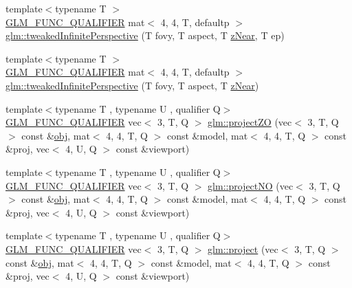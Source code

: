 \begin{DoxyCompactItemize}
\item 
{\footnotesize template$<$typename T $>$ }\\\hyperlink{setup_8hpp_a33fdea6f91c5f834105f7415e2a64407}{G\+L\+M\+\_\+\+F\+U\+N\+C\+\_\+\+Q\+U\+A\+L\+I\+F\+I\+ER} mat$<$ 4, 4, T, defaultp $>$ \hyperlink{group__gtc__matrix__transform_gaf5b3c85ff6737030a1d2214474ffa7a8}{glm\+::tweaked\+Infinite\+Perspective} (T fovy, T aspect, T \hyperlink{_s_d_l__opengl__glext_8h_a12d99226e590bbaaf0be69169eeb4834}{z\+Near}, T ep)
\item 
{\footnotesize template$<$typename T $>$ }\\\hyperlink{setup_8hpp_a33fdea6f91c5f834105f7415e2a64407}{G\+L\+M\+\_\+\+F\+U\+N\+C\+\_\+\+Q\+U\+A\+L\+I\+F\+I\+ER} mat$<$ 4, 4, T, defaultp $>$ \hyperlink{group__gtc__matrix__transform_gaaeacc04a2a6f4b18c5899d37e7bb3ef9}{glm\+::tweaked\+Infinite\+Perspective} (T fovy, T aspect, T \hyperlink{_s_d_l__opengl__glext_8h_a12d99226e590bbaaf0be69169eeb4834}{z\+Near})
\item 
{\footnotesize template$<$typename T , typename U , qualifier Q$>$ }\\\hyperlink{setup_8hpp_a33fdea6f91c5f834105f7415e2a64407}{G\+L\+M\+\_\+\+F\+U\+N\+C\+\_\+\+Q\+U\+A\+L\+I\+F\+I\+ER} vec$<$ 3, T, Q $>$ \hyperlink{group__gtc__matrix__transform_ga77d157525063dec83a557186873ee080}{glm\+::project\+ZO} (vec$<$ 3, T, Q $>$ const \&\hyperlink{_s_d_l__opengl__glext_8h_a0c0d4701a6c89f4f7f0640715d27ab26}{obj}, mat$<$ 4, 4, T, Q $>$ const \&model, mat$<$ 4, 4, T, Q $>$ const \&proj, vec$<$ 4, U, Q $>$ const \&viewport)
\item 
{\footnotesize template$<$typename T , typename U , qualifier Q$>$ }\\\hyperlink{setup_8hpp_a33fdea6f91c5f834105f7415e2a64407}{G\+L\+M\+\_\+\+F\+U\+N\+C\+\_\+\+Q\+U\+A\+L\+I\+F\+I\+ER} vec$<$ 3, T, Q $>$ \hyperlink{group__gtc__matrix__transform_ga05249751f48d14cb282e4979802b8111}{glm\+::project\+NO} (vec$<$ 3, T, Q $>$ const \&\hyperlink{_s_d_l__opengl__glext_8h_a0c0d4701a6c89f4f7f0640715d27ab26}{obj}, mat$<$ 4, 4, T, Q $>$ const \&model, mat$<$ 4, 4, T, Q $>$ const \&proj, vec$<$ 4, U, Q $>$ const \&viewport)
\item 
{\footnotesize template$<$typename T , typename U , qualifier Q$>$ }\\\hyperlink{setup_8hpp_a33fdea6f91c5f834105f7415e2a64407}{G\+L\+M\+\_\+\+F\+U\+N\+C\+\_\+\+Q\+U\+A\+L\+I\+F\+I\+ER} vec$<$ 3, T, Q $>$ \hyperlink{group__gtc__matrix__transform_gaf36e96033f456659e6705472a06b6e11}{glm\+::project} (vec$<$ 3, T, Q $>$ const \&\hyperlink{_s_d_l__opengl__glext_8h_a0c0d4701a6c89f4f7f0640715d27ab26}{obj}, mat$<$ 4, 4, T, Q $>$ const \&model, mat$<$ 4, 4, T, Q $>$ const \&proj, vec$<$ 4, U, Q $>$ const \&viewport)

\end{DoxyCompactItemize}
